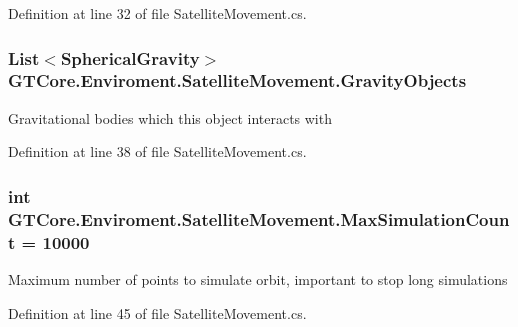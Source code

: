 Definition at line 32 of file Satellite\+Movement.\+cs.

\hypertarget{class_g_t_core_1_1_enviroment_1_1_satellite_movement_a584e1245a9f119598f6fec5556612484}{}
\subsubsection[{Gravity\+Objects}]{\setlength{\rightskip}{0pt plus 5cm}List$<${\bf Spherical\+Gravity}$>$ G\+T\+Core.\+Enviroment.\+Satellite\+Movement.\+Gravity\+Objects}\label{class_g_t_core_1_1_enviroment_1_1_satellite_movement_a584e1245a9f119598f6fec5556612484}


Gravitational bodies which this object interacts with 



Definition at line 38 of file Satellite\+Movement.\+cs.

\hypertarget{class_g_t_core_1_1_enviroment_1_1_satellite_movement_af7c8eb740e4d9802edadfa1d4c605f26}{}
\subsubsection[{Max\+Simulation\+Count}]{\setlength{\rightskip}{0pt plus 5cm}int G\+T\+Core.\+Enviroment.\+Satellite\+Movement.\+Max\+Simulation\+Count = 10000}\label{class_g_t_core_1_1_enviroment_1_1_satellite_movement_af7c8eb740e4d9802edadfa1d4c605f26}


Maximum number of points to simulate orbit, important to stop long simulations 



Definition at line 45 of file Satellite\+Movement.\+cs.

\hypertarget{class_g_t_core_1_1_enviroment_1_1_satellite_movement_a50b66bcd0969474ef47af91dcd129b72}{}
